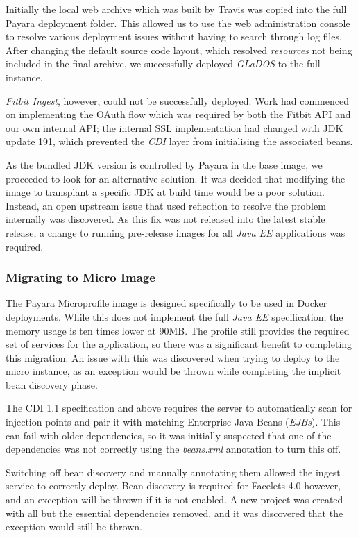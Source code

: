 Initially the local web archive which was built by Travis was copied into the full Payara deployment folder. This allowed us to use the web administration console to resolve various deployment issues without having to search through log files. After changing the default source code layout, which resolved \textit{resources} not being included in the final archive, we successfully deployed \textit{GLaDOS} to the full instance.

\textit{Fitbit Ingest}, however, could not be successfully deployed. Work had commenced on implementing the OAuth flow which was required by both the Fitbit API and our own internal API; the internal SSL implementation had changed with JDK update 191, which prevented the \textit{CDI} layer from initialising the associated beans.

As the bundled JDK version is controlled by Payara in the base image, we proceeded to look for an alternative solution. It was decided that modifying the image to transplant a specific JDK at build time would be a poor solution. Instead, an open upstream issue\cite{payara_ssl_issue} that used reflection to resolve the problem internally was discovered. As this fix was not released into the latest stable release, a change to running pre-release images for all \textit{Java EE} applications was required.

\subsubsection{Migrating to Micro Image}
The Payara Microprofile image is designed specifically to be used in Docker deployments. While this does not implement the full \textit{Java EE} specification, the memory usage is ten times lower at 90MB. The profile still provides the required set of services for the application, so there was a significant benefit to completing this migration. An issue with this was discovered when trying to deploy to the micro instance, as an exception would be thrown while completing the implicit bean discovery phase.

The CDI 1.1 specification and above requires the server to automatically scan for injection points and pair it with matching Enterprise Java Beans (\textit{EJBs}). This can fail with older dependencies, so it was initially suspected that one of the dependencies was not correctly using the \textit{beans.xml} annotation to turn this off.

Switching off bean discovery and manually annotating them allowed the ingest service to correctly deploy. Bean discovery is required for Facelets 4.0 however, and an exception will be thrown if it is not enabled. A new project was created with all but the essential dependencies removed, and it was discovered that the exception would still be thrown.

